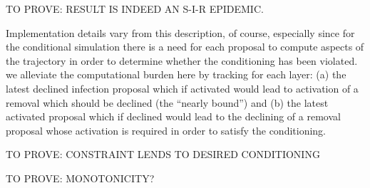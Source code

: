 \documentclass{article}
\begin{document}
TO PROVE: RESULT IS INDEED AN S-I-R EPIDEMIC. 

Implementation details vary from this description, of course,
especially since for the conditional simulation there is a need for
each proposal to compute aspects of the trajectory in order to
determine whether the conditioning has been violated. we alleviate the
computational burden here by tracking for each layer: (a) the latest
declined infection proposal which if activated would lead to
activation of a removal which should be declined (the ``nearly bound'')
and (b) the latest activated proposal which if declined would lead to
the declining of a removal proposal whose activation is required in
order to satisfy the conditioning.

TO PROVE: CONSTRAINT LENDS TO DESIRED CONDITIONING 

TO PROVE: MONOTONICITY?  
\end{document}
